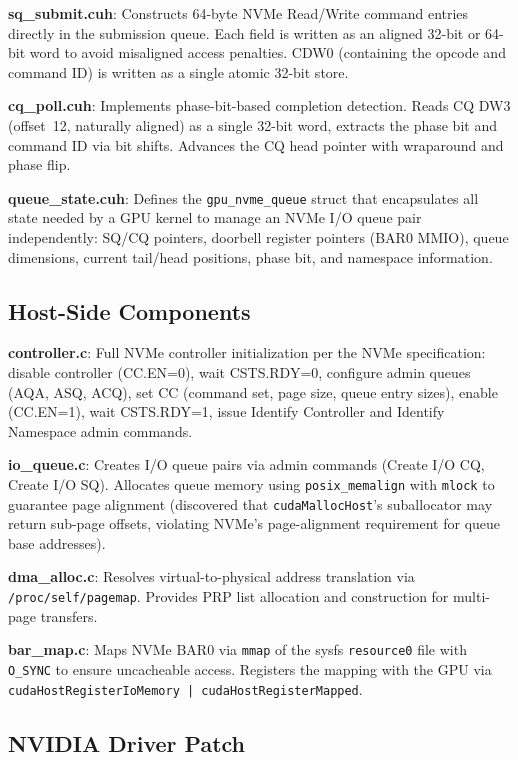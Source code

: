 \documentclass{article}
\begin{document}
\textbf{sq\_submit.cuh}: Constructs 64-byte NVMe Read/Write command entries
directly in the submission queue. Each field is written as an aligned 32-bit
or 64-bit word to avoid misaligned access penalties. CDW0 (containing the
opcode and command ID) is written as a single atomic 32-bit store.

\textbf{cq\_poll.cuh}: Implements phase-bit-based completion detection. Reads
CQ DW3 (offset~12, naturally aligned) as a single 32-bit word, extracts the
phase bit and command ID via bit shifts. Advances the CQ head pointer with
wraparound and phase flip.

\textbf{queue\_state.cuh}: Defines the \texttt{gpu\_nvme\_queue} struct that
encapsulates all state needed by a GPU kernel to manage an NVMe I/O queue pair
independently: SQ/CQ pointers, doorbell register pointers (BAR0 MMIO),
queue dimensions, current tail/head positions, phase bit, and namespace
information.

\subsection{Host-Side Components}

\textbf{controller.c}: Full NVMe controller initialization per the NVMe
specification: disable controller (CC.EN=0), wait CSTS.RDY=0, configure admin
queues (AQA, ASQ, ACQ), set CC (command set, page size, queue entry sizes),
enable (CC.EN=1), wait CSTS.RDY=1, issue Identify Controller and Identify
Namespace admin commands.

\textbf{io\_queue.c}: Creates I/O queue pairs via admin commands (Create I/O CQ,
Create I/O SQ). Allocates queue memory using \texttt{posix\_memalign} with
\texttt{mlock} to guarantee page alignment (discovered that
\texttt{cudaMallocHost}'s suballocator may return sub-page offsets, violating
NVMe's page-alignment requirement for queue base addresses).

\textbf{dma\_alloc.c}: Resolves virtual-to-physical address translation via
\texttt{/proc/self/pagemap}. Provides PRP list allocation and construction
for multi-page transfers.

\textbf{bar\_map.c}: Maps NVMe BAR0 via \texttt{mmap} of the sysfs
\texttt{resource0} file with \texttt{O\_SYNC} to ensure uncacheable access.
Registers the mapping with the GPU via \texttt{cudaHostRegisterIoMemory |
cudaHostRegisterMapped}.

\subsection{NVIDIA Driver Patch}
\end{document}

